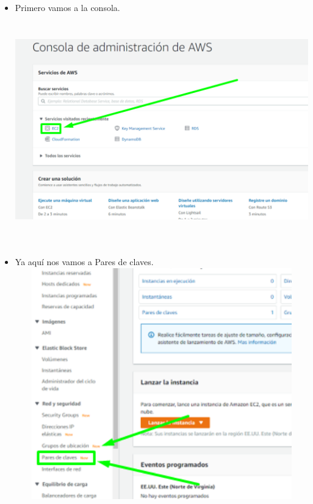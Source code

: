\documentclass[12pt,a4paper,oneside]{book}
\begin{document}
\newpage
\begin{itemize}
	\item {Primero vamos a la consola.}\\
	
	\includegraphics[width=16cm, height=10cm]{img/3.png}\\
	
	\item {Ya aquí nos vamos a Pares de claves.}\\
	
	\includegraphics[width=16cm, height=10cm]{img/4.png}\\
	
\end{itemize}
\end{document}

